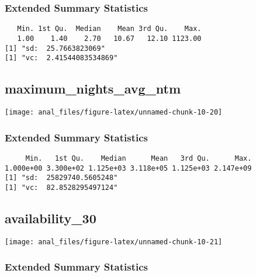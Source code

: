 \hypertarget{extended-summary-statistics-5}{%
\subsubsection{Extended Summary
Statistics}\label{extended-summary-statistics-5}}

\begin{verbatim}   Min. 1st Qu.  Median    Mean 3rd Qu.    Max. 
   1.00    1.40    2.70   10.67   12.10 1123.00 
[1] "sd:  25.7663823069"
[1] "vc:  2.41544083534869"
\end{verbatim}

\pagebreak

\hypertarget{maximum_nights_avg_ntm}{%
\subsection{maximum\_nights\_avg\_ntm}\label{maximum_nights_avg_ntm}}

\begin{center}\texttt{[image: anal\_files/figure-latex/unnamed-chunk-10-20]} \end{center}

\hypertarget{extended-summary-statistics-6}{%
\subsubsection{Extended Summary
Statistics}\label{extended-summary-statistics-6}}

\begin{verbatim}     Min.   1st Qu.    Median      Mean   3rd Qu.      Max. 
1.000e+00 3.300e+02 1.125e+03 3.118e+05 1.125e+03 2.147e+09 
[1] "sd:  25829740.5605248"
[1] "vc:  82.8528295497124"
\end{verbatim}

\pagebreak

\hypertarget{availability_30}{%
\subsection{availability\_30}\label{availability_30}}

\begin{center}\texttt{[image: anal\_files/figure-latex/unnamed-chunk-10-21]} \end{center}

\hypertarget{extended-summary-statistics-7}{%
\subsubsection{Extended Summary
Statistics}\label{extended-summary-statistics-7}}

